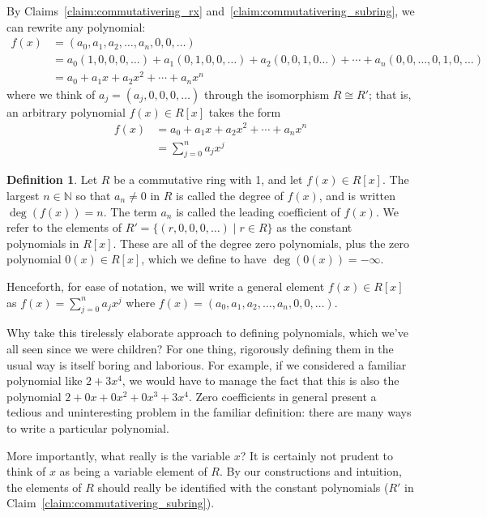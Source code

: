 \documentclass[12pt,letterpaper,DIV=11,final]{scrartcl}
\theoremstyle{plain}
\theoremstyle{definition}
\newtheorem{definition}{Definition}[section]
\theoremstyle{remark}
\begin{document}
By Claims~\ref{claim:commutativering_rx} and~\ref{claim:commutativering_subring}, we can rewrite any polynomial:
\begin{align*}
  f(x) &= (a_0, a_1, a_2, \dots, a_n, 0, 0, \dots) \\
       &= a_0 (1, 0, 0, 0, \dots) + a_1 (0, 1, 0, 0, \dots) + a_2 (0, 0, 1, 0 \dots) + \cdots + a_n (0, 0, \dots, 0, 1, 0, \dots) \\
       &= a_0 + a_1 x + a_2 x^2 + \cdots + a_n x^n
\end{align*}
where we think of $a_j = (a_j, 0, 0, 0, \dots)$ through the isomorphism $R \cong R'$; that is, an arbitrary polynomial $f(x) \in R[x]$ takes the form
\begin{align*}
  f(x) &= a_0 + a_1 x + a_2 x^2 + \cdots + a_n x^n \\
       &= \sum_{j = 0}^n a_j x^j
\end{align*}

\begin{definition}
  Let $R$ be a commutative ring with 1, and let $f(x) \in R[x]$.
  The largest $n \in \mathbb{N}$ so that $a_n \neq 0$ in $R$ is called the degree of $f(x)$, and is written $\deg(f(x)) = n$.
  The term $a_n$ is called the leading coefficient of $f(x)$.
  We refer to the elements of $R' = \{ (r, 0, 0, 0, \dots) \mid r \in R \}$ as the constant polynomials in $R[x]$.
  These are all of the degree zero polynomials, plus the zero polynomial $0(x) \in R[x]$, which we define to have $\deg(0(x)) = - \infty$.
\end{definition}

Henceforth, for ease of notation, we will write a general element $f(x) \in R[x]$ as $f(x) = \sum_{j = 0}^n a_j x^j$ where $f(x) = (a_0, a_1, a_2, \dots, a_n, 0, 0, \dots)$.

Why take this tirelessly elaborate approach to defining polynomials, which we've all seen since we were children?
For one thing, rigorously defining them in the usual way is itself boring and laborious.
For example, if we considered a familiar polynomial like $2 + 3x^4$, we would have to manage the fact that this is also the polynomial $2 + 0x + 0x^2 + 0x^3 + 3x^4$.
Zero coefficients in general present a tedious and uninteresting problem in the familiar definition:
there are many ways to write a particular polynomial.

More importantly, what really is the variable $x$?
It is certainly not prudent to think of $x$ as being a variable element of $R$.
By our constructions and intuition, the elements of $R$ should really be identified with the constant polynomials ($R'$ in Claim~\ref{claim:commutativering_subring}).
\end{document}
